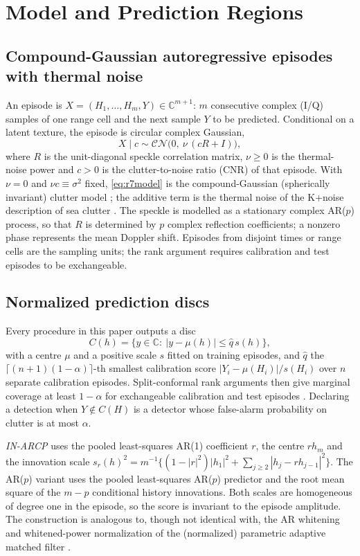 \documentclass[journal]{IEEEtran}
\begin{document}
\section{Model and Prediction Regions}
\subsection{Compound-Gaussian autoregressive episodes with thermal noise}
An episode is $X=(H_1,\dots,H_m,Y)\in\mathbb{C}^{m+1}$: $m$ consecutive complex (I/Q) samples of one range cell and the next sample $Y$ to be predicted. Conditional on a latent texture, the episode is circular complex Gaussian,
\begin{equation}
X\mid c\sim\mathcal{CN}\big(0,\ \nu\,(cR+I)\big),
\label{eq:r7model}
\end{equation}
where $R$ is the unit-diagonal speckle correlation matrix, $\nu\ge0$ is the thermal-noise power and $c>0$ is the clutter-to-noise ratio (CNR) of that episode. With $\nu=0$ and $\nu c\equiv\sigma^2$ fixed, \eqref{eq:r7model} is the compound-Gaussian (spherically invariant) clutter model \cite{conte1995,ollila2012}; the additive term is the thermal noise of the K+noise description of sea clutter \cite{watts1987,ward2013}. The speckle is modelled as a stationary complex AR($p$) process, so that $R$ is determined by $p$ complex reflection coefficients; a nonzero phase represents the mean Doppler shift. Episodes from disjoint times or range cells are the sampling units; the rank argument requires calibration and test episodes to be exchangeable.

\subsection{Normalized prediction discs}
Every procedure in this paper outputs a disc
\begin{equation}
C(h)=\{y\in\mathbb C:\ |y-\mu(h)|\le \widehat q\,s(h)\},
\label{eq:disc}
\end{equation}
with a centre $\mu$ and a positive scale $s$ fitted on training episodes, and $\widehat q$ the $\lceil(n+1)(1-\alpha)\rceil$-th smallest calibration score $|Y_i-\mu(H_i)|/s(H_i)$ over $n$ separate calibration episodes. Split-conformal rank arguments then give marginal coverage at least $1-\alpha$ for exchangeable calibration and test episodes \cite{lei2018}. Declaring a detection when $Y\notin C(H)$ is a detector whose false-alarm probability on clutter is at most $\alpha$.

\emph{IN-ARCP} uses the pooled least-squares AR(1) coefficient $r$, the centre $rh_m$ and the innovation scale $s_r(h)^2=m^{-1}\{(1-|r|^2)|h_1|^2+\sum_{j\ge2}|h_j-rh_{j-1}|^2\}$. The AR($p$) variant uses the pooled least-squares AR($p$) predictor and the root mean square of the $m-p$ conditional history innovations. Both scales are homogeneous of degree one in the episode, so the score is invariant to the episode amplitude. The construction is analogous to, though not identical with, the AR whitening and whitened-power normalization of the (normalized) parametric adaptive matched filter \cite{roman2000,michels2000}.
\end{document}
